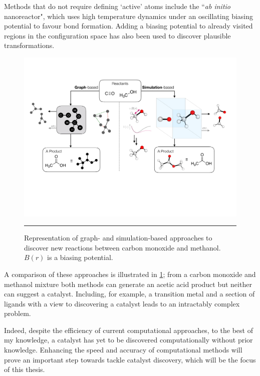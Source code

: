 \documentclass[../main.tex]{subfiles}
\begin{document}
Methods that do not require defining `active' atoms include the ``\emph{ab initio} nanoreactor"\cite{Wang2014}, which uses high temperature dynamics under an oscillating biasing potential to favour bond formation. Adding a biasing potential to already visited regions in the configuration space has also been used to discover plausible transformations.\cite{Grimme2019} 


\begin{figure}[t!]
	\centering
	\vspace{0.4cm}
	\includegraphics[width=14cm]{1/figs/fig2/fig2.pdf}
	\vspace{0.4cm}
	\hrule
	\caption{Representation of graph- and simulation-based approaches to discover new reactions between carbon monoxide and methanol. $B(r)$ is a biasing potential.}
	\label{fig::intro_X3}
\end{figure}

A comparison of these approaches is illustrated in \figurename{ \ref{fig::intro_X3}}; from a carbon monoxide and methanol mixture both methods can generate an acetic acid product but neither can suggest a catalyst. Including, for example, a transition metal and a section of ligands with a view to discovering a catalyst leads to an intractably complex problem. 

Indeed, despite the efficiency of current computational approaches, to the best of my knowledge, a catalyst has yet to be discovered computationally without prior knowledge. Enhancing the speed and accuracy of computational methods will prove an important step towards tackle catalyst discovery, which will be the focus of this thesis.
\end{document}
